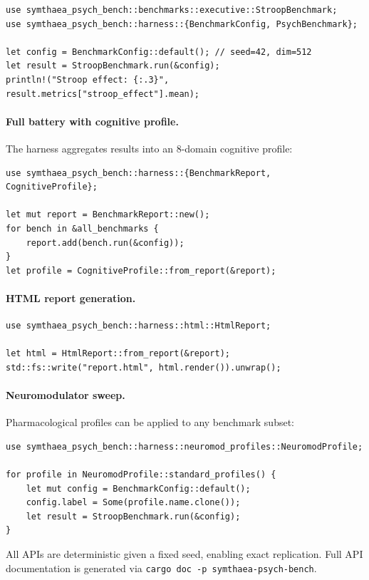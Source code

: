 \documentclass[10pt,landscape]{article}
\begin{document}
\begin{verbatim}
use symthaea_psych_bench::benchmarks::executive::StroopBenchmark;
use symthaea_psych_bench::harness::{BenchmarkConfig, PsychBenchmark};

let config = BenchmarkConfig::default(); // seed=42, dim=512
let result = StroopBenchmark.run(&config);
println!("Stroop effect: {:.3}", result.metrics["stroop_effect"].mean);
\end{verbatim}

\paragraph{Full battery with cognitive profile.} The harness aggregates results into an 8-domain cognitive profile:

\begin{verbatim}
use symthaea_psych_bench::harness::{BenchmarkReport, CognitiveProfile};

let mut report = BenchmarkReport::new();
for bench in &all_benchmarks {
    report.add(bench.run(&config));
}
let profile = CognitiveProfile::from_report(&report);
\end{verbatim}

\paragraph{HTML report generation.}

\begin{verbatim}
use symthaea_psych_bench::harness::html::HtmlReport;

let html = HtmlReport::from_report(&report);
std::fs::write("report.html", html.render()).unwrap();
\end{verbatim}

\paragraph{Neuromodulator sweep.} Pharmacological profiles can be applied to any benchmark subset:

\begin{verbatim}
use symthaea_psych_bench::harness::neuromod_profiles::NeuromodProfile;

for profile in NeuromodProfile::standard_profiles() {
    let mut config = BenchmarkConfig::default();
    config.label = Some(profile.name.clone());
    let result = StroopBenchmark.run(&config);
}
\end{verbatim}

\noindent All APIs are deterministic given a fixed seed, enabling exact replication. Full API documentation is generated via \texttt{cargo doc -p symthaea-psych-bench}.



\end{document}
